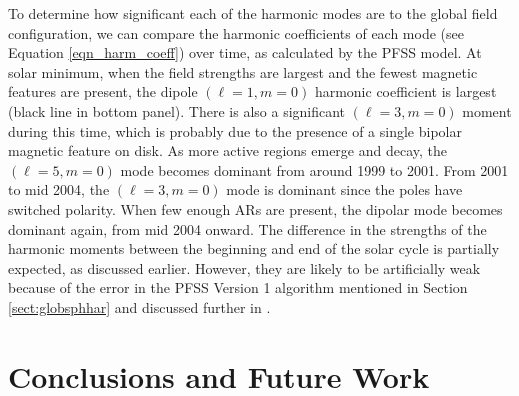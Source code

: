 To determine how significant each of the harmonic modes are to the global field configuration, we can compare the harmonic coefficients of each mode (see Equation \ref{eqn_harm_coeff}) over time, as calculated by the \gls{PFSS} model. At solar minimum, when the field strengths are largest and the fewest magnetic features are present, the dipole $(\ell=1,m=0)$ harmonic coefficient is largest (black line in bottom panel). There is also a significant $(\ell=3,m=0)$ moment during this time, which is probably due to the presence of a single bipolar magnetic feature on disk. As more active regions emerge and decay, the $(\ell=5,m=0)$ mode becomes dominant from around 1999 to 2001. From 2001 to mid 2004, the $(\ell=3,m=0)$ mode is dominant since the poles have switched polarity. When few enough \glspl{AR} are present, the dipolar mode becomes dominant again, from mid 2004 onward. The difference in the strengths of the harmonic moments between the beginning and end of the solar cycle is partially expected, as discussed earlier. However, they are likely to be artificially weak because of the error in the PFSS Version 1 algorithm mentioned in Section\,\ref{sect:globsphhar} and discussed further in .


\section{Conclusions and Future Work}\label{discussion}

